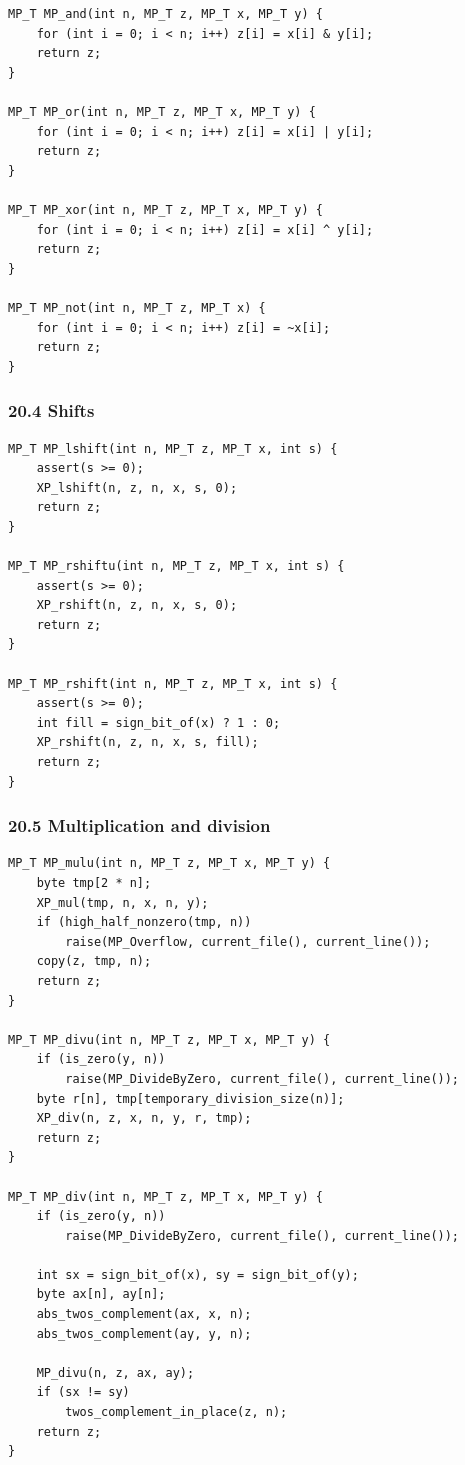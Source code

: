 \documentclass[11pt]{article}
\begin{document}
\begin{verbatim}
MP_T MP_and(int n, MP_T z, MP_T x, MP_T y) {
    for (int i = 0; i < n; i++) z[i] = x[i] & y[i];
    return z;
}

MP_T MP_or(int n, MP_T z, MP_T x, MP_T y) {
    for (int i = 0; i < n; i++) z[i] = x[i] | y[i];
    return z;
}

MP_T MP_xor(int n, MP_T z, MP_T x, MP_T y) {
    for (int i = 0; i < n; i++) z[i] = x[i] ^ y[i];
    return z;
}

MP_T MP_not(int n, MP_T z, MP_T x) {
    for (int i = 0; i < n; i++) z[i] = ~x[i];
    return z;
}
\end{verbatim}

\subsubsection{20.4 Shifts}\label{shifts}

\begin{verbatim}
MP_T MP_lshift(int n, MP_T z, MP_T x, int s) {
    assert(s >= 0);
    XP_lshift(n, z, n, x, s, 0);
    return z;
}

MP_T MP_rshiftu(int n, MP_T z, MP_T x, int s) {
    assert(s >= 0);
    XP_rshift(n, z, n, x, s, 0);
    return z;
}

MP_T MP_rshift(int n, MP_T z, MP_T x, int s) {
    assert(s >= 0);
    int fill = sign_bit_of(x) ? 1 : 0;
    XP_rshift(n, z, n, x, s, fill);
    return z;
}
\end{verbatim}

\subsubsection{20.5 Multiplication and division}\label{multiplication-and-division}

\begin{verbatim}
MP_T MP_mulu(int n, MP_T z, MP_T x, MP_T y) {
    byte tmp[2 * n];
    XP_mul(tmp, n, x, n, y);
    if (high_half_nonzero(tmp, n))
        raise(MP_Overflow, current_file(), current_line());
    copy(z, tmp, n);
    return z;
}

MP_T MP_divu(int n, MP_T z, MP_T x, MP_T y) {
    if (is_zero(y, n))
        raise(MP_DivideByZero, current_file(), current_line());
    byte r[n], tmp[temporary_division_size(n)];
    XP_div(n, z, x, n, y, r, tmp);
    return z;
}

MP_T MP_div(int n, MP_T z, MP_T x, MP_T y) {
    if (is_zero(y, n))
        raise(MP_DivideByZero, current_file(), current_line());

    int sx = sign_bit_of(x), sy = sign_bit_of(y);
    byte ax[n], ay[n];
    abs_twos_complement(ax, x, n);
    abs_twos_complement(ay, y, n);

    MP_divu(n, z, ax, ay);
    if (sx != sy)
        twos_complement_in_place(z, n);
    return z;
}
\end{verbatim}
\end{document}
